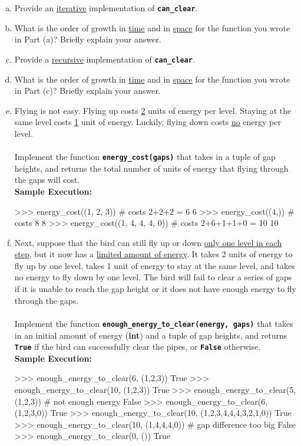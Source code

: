 \begin{enumerate}[(a)]
\item Provide an \underline{iterative} implementation of \texttt{\bfseries can\_clear}.

\item What is the order of growth in \underline{time} and in \underline{space} for the function you wrote in Part (a)?
Briefly explain your answer.

\item Provide a \underline{recursive} implementation of \texttt{\bfseries can\_clear}.

\item What is the order of growth in \underline{time} and in \underline{space} for the function you wrote in Part (c)?
Briefly explain your answer.

\item Flying is not easy. Flying up costs \underline{2} units of energy per level. Staying at the same level costs 
\underline{1} unit of energy. Luckily, flying down costs \underline{no} energy per level. \\ \\
Implement the function \texttt{\bfseries energy\_cost(gaps)} that takes in a tuple of gap heights, and
returns the total number of units of energy that flying through the gaps will cost. \\
\textbf{Sample Execution:}
\begin{python}
>>> energy_cost((1, 2, 3))          # costs 2+2+2 = 6
6
>>> energy_cost((4,))               # costs 8
8
>>> energy_cost((1, 4, 4, 4, 0))    # costs 2+6+1+1+0 = 10
10
\end{python}

\item Next, suppose that the bird can still fly up or down \underline{only one level in each step}, but it now has
a \underline{limited amount of energy}. It takes 2 units of energy to fly up by one level, takes 1 unit of
energy to stay at the same level, and takes no energy to fly down by one level. The bird will fail
to clear a series of gaps if it is unable to reach the gap height or it does not have enough energy
to fly through the gaps. \\ \\
Implement the function \texttt{\bfseries enough\_energy\_to\_clear(energy, gaps)} that takes in an initial amount 
of energy (\textbf{int}) and a tuple of gap heights, and returns \texttt{\bfseries True} if the bird can successfully 
clear the pipes, or \texttt{\bfseries False} otherwise. \\
\textbf{Sample Execution:}
\begin{python}
>>> enough_energy_to_clear(6, (1,2,3))
True
>>> enough_energy_to_clear(10, (1,2,3))
True
>>> enough_energy_to_clear(5, (1,2,3))      # not enough energy
False
>>> enough_energy_to_clear(6, (1,2,3,0))
True
>>> enough_energy_to_clear(10, (1,2,3,4,4,4,3,2,1,0))
True
>>> enough_energy_to_clear(10, (1,4,4,4,0)) # gap difference too big
False
>>> enough_energy_to_clear(0, ())
True
\end{python}
\end{enumerate}

